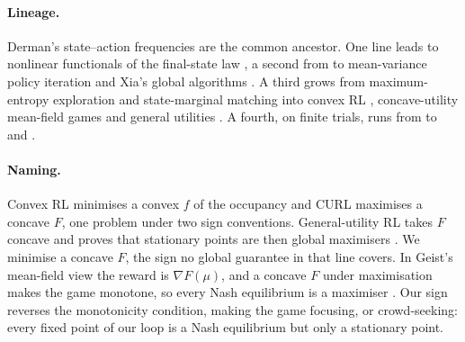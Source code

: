 \documentclass[10pt]{article}
\begin{document}
\paragraph{Lineage.}
Derman's state--action frequencies \citep{Derman-finite70ch7} are the common ancestor. One line leads to nonlinear functionals of the final-state law \citep{Collins-using97}, a second from \citet{Filar-variance89} to mean-variance policy iteration \citep{Zhang-meanvariance21} and Xia's global algorithms \citep{Xia-global26}. A third grows from maximum-entropy exploration \citep{Hazan-provably19} and state-marginal matching \citep{Lee-efficient19} into convex RL \citep{Zahavy-reward21}, concave-utility mean-field games \citep{Geist-concave22} and general utilities \citep{Zhang-variational20}. A fourth, on finite trials, runs from \citet{Mutti-challenging22} to \citet{Mutti-convex23} and \citet{Santos-number25,Santos-solving26}.

\paragraph{Naming.}
Convex RL minimises a convex $f$ of the occupancy and CURL maximises a concave $F$, one problem under two sign conventions. General-utility RL takes $F$ concave and proves that stationary points are then global maximisers \citep[Thm.~4.2]{Zhang-variational20}. We minimise a concave $F$, the sign no global guarantee in that line covers. In Geist's mean-field view the reward is $\nabla F(\mu)$, and a concave $F$ under maximisation makes the game monotone, so every Nash equilibrium is a maximiser \citep[Property~1, Thm.~1]{Geist-concave22}. Our sign reverses the monotonicity condition, making the game focusing, or crowd-seeking: every fixed point of our loop is a Nash equilibrium but only a stationary point.
\end{document}
